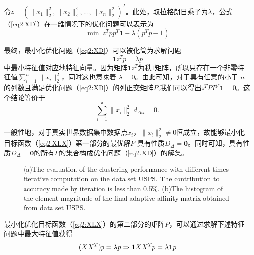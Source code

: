 令$z=(\|x_1\|_2^2, \|x_2\|_2^2, ... , \|x_n\|_2^2)^T$。此处，取拉格朗日乘子为$\lambda$，公式（\ref{eq2:XD}）在一维情况下的优化问题可以表示为
\begin{equation}
	\mathop{\mathrm{min}}\; z^Tpp^T\textbf{1}-\lambda (p^Tp-1)
\end{equation}

最终，最小化优化问题（\ref{eq2:XD}）可以被化简为求解问题
\begin{equation}
	\textbf{1}z^Tp=\lambda p
\end{equation}
中最小特征值对应地特征向量。因为矩阵$\textbf{1}z^T$为秩$1$矩阵，所以只存在一个非零特征值$\sum_{i=1}^{n}\|x_i\|_2^2$，同时这也意味着 $\lambda = 0$。由此可知，对于具有任意的小于 $n$的列数且满足优化问题（\ref{eq2:XD}）的列正交矩阵$P$,我们可以得出$z^TPP^T\textbf{1}=0$。这个结论等价于
\begin{equation}
	\sum_{i=1}^{n} \|x_i\|_2^2\;d_{\Delta ii} = 0.
\end{equation}

一般性地，对于真实世界数据集中数据点$x_i$，$\|x_i\|_2^2\neq0$恒成立，故能够最小化目标函数（\ref{eq2:XLX}）第一部分的最优解$P$ 具有性质$D_\Delta = \textbf{0}$。同时可知，具有性质$D_\Delta = \textbf{0}$的所有$P$的集合构成优化问题（\ref{eq2:XD}）的解集。

\begin{figure}[t]
	\centering
	\hspace{1em}
			  {(a)The evaluation of the clustering performance with different times iterative computation on the data set USPS. The contribution to accuracy made by iteration is less than 0.5\%. (b)The histogram of the element magnitude of the final adaptive affinity matrix obtained from data set USPS. }
\end{figure}

最小化优化目标函数（\ref{eq2:XLX}）的第二部分的矩阵$P$，可以通过求解下述特征问题中最大特征值获得：
\begin{equation}
	\begin{split}
		(XX^T)p = \lambda p
		\Rightarrow {\bf1}XX^Tp = \lambda {\bf1}p
	\end{split}
	\label{eq2:Solu}
\end{equation}

